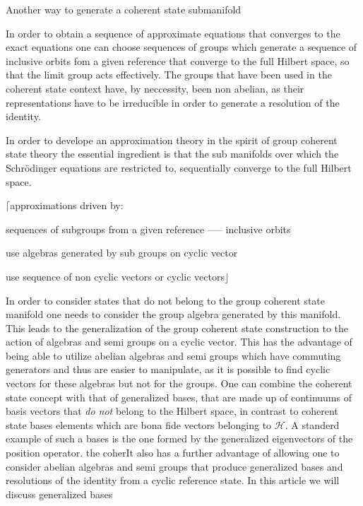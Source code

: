 \documentclass[aps,preprint]{revtex4}%
\begin{document}
Another way to generate a coherent state submanifold 

In order to obtain a sequence of approximate equations that converges to the
exact equations one can choose sequences of groups which generate a sequence
of inclusive orbits fom a given reference that converge to the full Hilbert
space, so that the limit group acts effectively. The groups that have been
used in the coherent state context have, by neccessity, been non abelian, as
their representations have to be irreducible in order to generate a resolution
of the identity.

In order to develope an approximation theory in the spirit of group coherent
state theory the essential ingredient is that the sub manifolds over which the
Schr\"{o}dinger equations are restricted to, sequentially converge to the full
Hilbert space.

$\lceil$approximations driven by:

\begin{description}
\item sequences of subgroups from a given reference ----- inclusive orbits

\item use algebras generated by sub groups on cyclic vector

\item use sequence of non cyclic vectors or cyclic vectors$\rfloor$
\end{description}

In order to consider states that do not belong to the group coherent state
manifold one needs to consider the group algebra generated by this manifold.
This leads to the generalization of the group coherent state construction to
the action of algebras and semi groups on a cyclic vector. This has the
advantage of being able to utilize abelian algebras and semi groups which have
commuting generators and thus are easier to manipulate, as it is possible to
find cyclic vectors for these algebras but not for the groups. One can combine
the coherent state concept with that of generalized bases, that are made up of
continuums of basis vectors that \emph{do not }belong to the Hilbert space, in
contrast to coherent state bases elements which are bona fide vectors
belonging to $\mathcal{H}$. A standerd example of such a bases is the one
formed by the generalized eigenvectors of the position operator. the coherIt
also has a further advantage of allowing one to consider abelian algebras and
semi groups that produce generalized bases and resolutions of the identity
from a cyclic reference state. In this article we will discuss generalized bases
\end{document}
